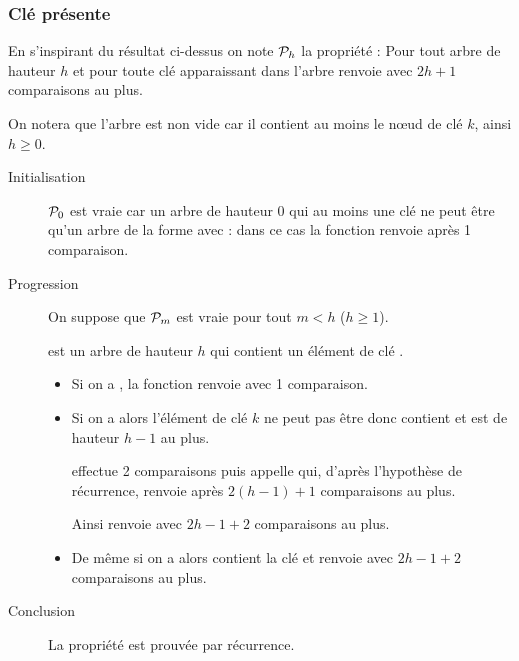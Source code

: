 \subsubsection{Clé présente}
 En s'inspirant du résultat ci-dessus on note ${\cal P}_h$ la propriété :
{Pour tout arbre  de hauteur $h$ et pour toute clé  apparaissant dans l'arbre 
 renvoie  avec $2h+1$ comparaisons au plus.}

On notera que l'arbre est non vide car il contient au moins le nœud de clé $k$, ainsi $h\ge 0$.

\begin{description}
\item[Initialisation] ${\cal P}_0$ est vraie car un arbre de hauteur 0 qui au moins une clé ne peut être qu'un arbre de la forme 
  avec  :  dans ce cas la fonction renvoie  après 1 comparaison.

\item[Progression] On suppose que  ${\cal P}_m$ est vraie pour tout $m< h$ ($h\ge 1$). 

 est un arbre de hauteur $h$ qui contient  un élément de clé .

\begin{itemize}
\item Si on a , la fonction  renvoie  avec 1 comparaison.

\item Si on a  alors l'élément de clé $k$ ne peut pas être  donc  contient  et est de hauteur $h-1$ au plus.

  effectue 2 comparaisons puis appelle  qui, d'après l'hypothèse de récurrence, renvoie  après $2(h-1)+1$ comparaisons au plus. 
 
 Ainsi  renvoie  avec $2h-1+2$ comparaisons au plus.
 
\item De même si on a  alors  contient la clé   et  renvoie  avec $2h-1+2$ comparaisons au plus.
\end{itemize}
\item[Conclusion] La propriété est prouvée par récurrence.

\end{description}

